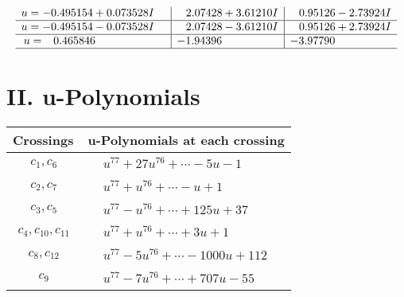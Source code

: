 \documentclass[1p]{elsarticle_modified}
\theoremstyle{definition}
\begin{document}
$$\begin{array}{c|c|c}
\begin{aligned}
u &= -0.495154 + 0.073528 I\end{aligned}
 & \phantom{-}2.07428 + 3.61210 I & \phantom{-}0.95126 - 2.73924 I \\ \hline\begin{aligned}
u &= -0.495154 - 0.073528 I\end{aligned}
 & \phantom{-}2.07428 - 3.61210 I & \phantom{-}0.95126 + 2.73924 I \\ \hline\begin{aligned}
u &= \phantom{-}0.465846\phantom{ +0.000000I}\end{aligned}
 & -1.94396\phantom{ +0.000000I} & -3.97790\phantom{ +0.000000I}\\
 \hline 
 \end{array}$$\newpage
\newpage\renewcommand{\arraystretch}{1}
\centering \section*{ II. u-Polynomials}
\begin{tabular}{m{50pt}|m{274pt}}
Crossings & \hspace{64pt}u-Polynomials at each crossing \\
\hline $$\begin{aligned}c_{1},c_{6}\end{aligned}$$&$\begin{aligned}
&u^{77}+27 u^{76}+\cdots-5 u-1
\end{aligned}$\\
\hline $$\begin{aligned}c_{2},c_{7}\end{aligned}$$&$\begin{aligned}
&u^{77}+u^{76}+\cdots- u+1
\end{aligned}$\\
\hline $$\begin{aligned}c_{3},c_{5}\end{aligned}$$&$\begin{aligned}
&u^{77}- u^{76}+\cdots+125 u+37
\end{aligned}$\\
\hline $$\begin{aligned}c_{4},c_{10},c_{11}\end{aligned}$$&$\begin{aligned}
&u^{77}+u^{76}+\cdots+3 u+1
\end{aligned}$\\
\hline $$\begin{aligned}c_{8},c_{12}\end{aligned}$$&$\begin{aligned}
&u^{77}-5 u^{76}+\cdots-1000 u+112
\end{aligned}$\\
\hline $$\begin{aligned}c_{9}\end{aligned}$$&$\begin{aligned}
&u^{77}-7 u^{76}+\cdots+707 u-55
\end{aligned}$\\
\hline
\end{tabular}\newpage\renewcommand{\arraystretch}{1}
\end{document}
